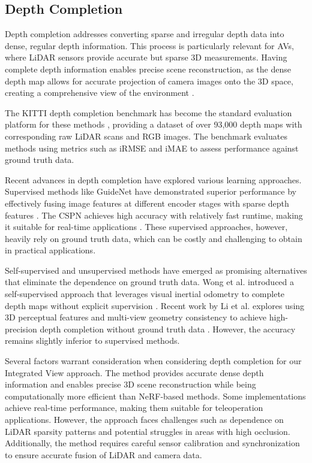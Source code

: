 \subsection{Depth Completion}

Depth completion addresses converting sparse and irregular depth data into dense, regular depth information. This process is particularly relevant for \acp{AV}, where \ac{LiDAR} sensors provide accurate but sparse 3D measurements. Having complete depth information enables precise scene reconstruction, as the dense depth map allows for accurate projection of camera images onto the 3D space, creating a comprehensive view of the environment \cite{tang2023comprehensive}.

The KITTI depth completion benchmark has become the standard evaluation platform for these methods \cite{uhrig2017sparsity}, providing a dataset of over 93,000 depth maps with corresponding raw \ac{LiDAR} scans and RGB images. The benchmark evaluates methods using metrics such as \ac{iRMSE} and \ac{iMAE} to assess performance against ground truth data.

Recent advances in depth completion have explored various learning approaches. Supervised methods like GuideNet have demonstrated superior performance by effectively fusing image features at different encoder stages with sparse depth features \cite{tang2023guidenet}. The \ac{CSPN} achieves high accuracy with relatively fast runtime, making it suitable for real-time applications \cite{cheng2020cspn}. These supervised approaches, however, heavily rely on ground truth data, which can be costly and challenging to obtain in practical applications.

Self-supervised and unsupervised methods have emerged as promising alternatives that eliminate the dependence on ground truth data. Wong et al. introduced a self-supervised approach that leverages visual inertial odometry to complete depth maps without explicit supervision \cite{wong2020unsupervised}. Recent work by Li et al. explores using 3D perceptual features and multi-view geometry consistency to achieve high-precision depth completion without ground truth data \cite{li2023self}. However, the accuracy remains slightly inferior to supervised methods.

Several factors warrant consideration when considering depth completion for our Integrated View approach. The method provides accurate dense depth information and enables precise 3D scene reconstruction while being computationally more efficient than \ac{NeRF}-based methods. Some implementations achieve real-time performance, making them suitable for teleoperation applications. However, the approach faces challenges such as dependence on \ac{LiDAR} sparsity patterns and potential struggles in areas with high occlusion. Additionally, the method requires careful sensor calibration and synchronization to ensure accurate fusion of \ac{LiDAR} and camera data.

